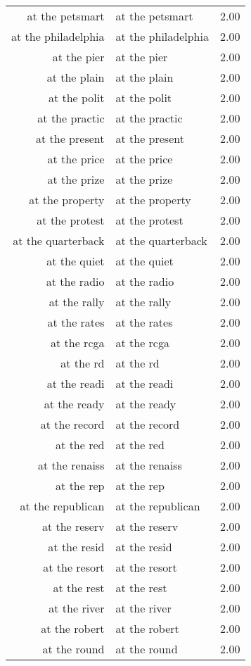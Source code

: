 \begin{table}[ht]
\begin{tabular}{rlr}
  at the petsmart & at the petsmart & 2.00 \\ 
  at the philadelphia & at the philadelphia & 2.00 \\ 
  at the pier & at the pier & 2.00 \\ 
  at the plain & at the plain & 2.00 \\ 
  at the polit & at the polit & 2.00 \\ 
  at the practic & at the practic & 2.00 \\ 
  at the present & at the present & 2.00 \\ 
  at the price & at the price & 2.00 \\ 
  at the prize & at the prize & 2.00 \\ 
  at the property & at the property & 2.00 \\ 
  at the protest & at the protest & 2.00 \\ 
  at the quarterback & at the quarterback & 2.00 \\ 
  at the quiet & at the quiet & 2.00 \\ 
  at the radio & at the radio & 2.00 \\ 
  at the rally & at the rally & 2.00 \\ 
  at the rates & at the rates & 2.00 \\ 
  at the rcga & at the rcga & 2.00 \\ 
  at the rd & at the rd & 2.00 \\ 
  at the readi & at the readi & 2.00 \\ 
  at the ready & at the ready & 2.00 \\ 
  at the record & at the record & 2.00 \\ 
  at the red & at the red & 2.00 \\ 
  at the renaiss & at the renaiss & 2.00 \\ 
  at the rep & at the rep & 2.00 \\ 
  at the republican & at the republican & 2.00 \\ 
  at the reserv & at the reserv & 2.00 \\ 
  at the resid & at the resid & 2.00 \\ 
  at the resort & at the resort & 2.00 \\ 
  at the rest & at the rest & 2.00 \\ 
  at the river & at the river & 2.00 \\ 
  at the robert & at the robert & 2.00 \\ 
  at the round & at the round & 2.00 \\ 

\end{tabular}
\end{table}

